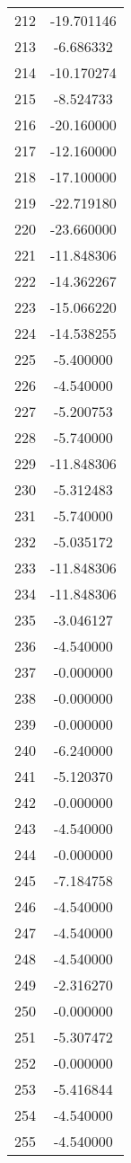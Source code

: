 \documentclass[12pt]{article}
\begin{document}
\begin{longtable}{@{}cc@{}}
212 & -19.701146 \\
213 & -6.686332 \\
214 & -10.170274 \\
215 & -8.524733 \\
216 & -20.160000 \\
217 & -12.160000 \\
218 & -17.100000 \\
219 & -22.719180 \\
220 & -23.660000 \\
221 & -11.848306 \\
222 & -14.362267 \\
223 & -15.066220 \\
224 & -14.538255 \\
225 & -5.400000 \\
226 & -4.540000 \\
227 & -5.200753 \\
228 & -5.740000 \\
229 & -11.848306 \\
230 & -5.312483 \\
231 & -5.740000 \\
232 & -5.035172 \\
233 & -11.848306 \\
234 & -11.848306 \\
235 & -3.046127 \\
236 & -4.540000 \\
237 & -0.000000 \\
238 & -0.000000 \\
239 & -0.000000 \\
240 & -6.240000 \\
241 & -5.120370 \\
242 & -0.000000 \\
243 & -4.540000 \\
244 & -0.000000 \\
245 & -7.184758 \\
246 & -4.540000 \\
247 & -4.540000 \\
248 & -4.540000 \\
249 & -2.316270 \\
250 & -0.000000 \\
251 & -5.307472 \\
252 & -0.000000 \\
253 & -5.416844 \\
254 & -4.540000 \\
255 & -4.540000 \\

\end{longtable}
\end{document}
